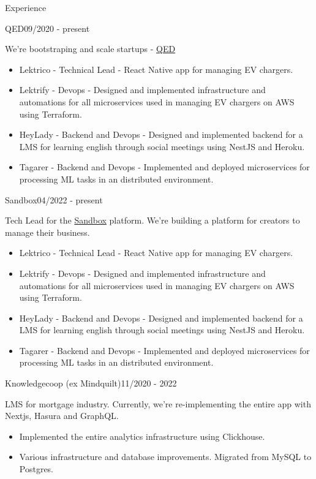 \documentclass{resume}
\begin{document}
\begin{rSection}{Experience}
    \begin{rSubsection}{QED}{09/2020 - present}{}{}
        \item We're bootstraping and scale startups - \href{https://qed.builders.com}{QED}
        \begin{itemize}
            \setlength\itemsep{-0.3em}
            \item Lektrico - Technical Lead - React Native app for managing EV chargers.
            \item Lektrify - Devops - Designed and implemented infrastructure and automations for all microservices used in managing EV chargers on AWS using Terraform.
            \item HeyLady - Backend and Devops - Designed and implemented backend for a LMS for learning english through social meetings using NestJS and Heroku.
            \item Tagarer - Backend and Devops - Implemented and deployed microservices for processing ML tasks in an distributed environment.
        \end{itemize}
    \end{rSubsection}

    \begin{rSubsection}{Sandbox}{04/2022 - present}{}{}
        \item Tech Lead for the \href{https://www.sandbox.com/}{Sandbox} platform. We're building a platform for creators to manage their business.
        \begin{itemize}
            \setlength\itemsep{-0.3em}
            \item Lektrico - Technical Lead - React Native app for managing EV chargers.
            \item Lektrify - Devops - Designed and implemented infrastructure and automations for all microservices used in managing EV chargers on AWS using Terraform.
            \item HeyLady - Backend and Devops - Designed and implemented backend for a LMS for learning english through social meetings using NestJS and Heroku.
            \item Tagarer - Backend and Devops - Implemented and deployed microservices for processing ML tasks in an distributed environment.
        \end{itemize}
    \end{rSubsection}

    \begin{rSubsection}{Knowledgecoop (ex Mindquilt)}{11/2020 - 2022}{}{}
        \item LMS for mortgage industry. Currently, we're re-implementing the entire app with Nextjs, Hasura and GraphQL.
        \begin{itemize}
            \setlength\itemsep{-0.3em}
            \item Implemented the entire analytics infrastructure using Clickhouse.
            \item Various infrastructure and database improvements. Migrated from MySQL to Postgres.
        \end{itemize}
    \end{rSubsection}


\end{rSection}
\end{document}
